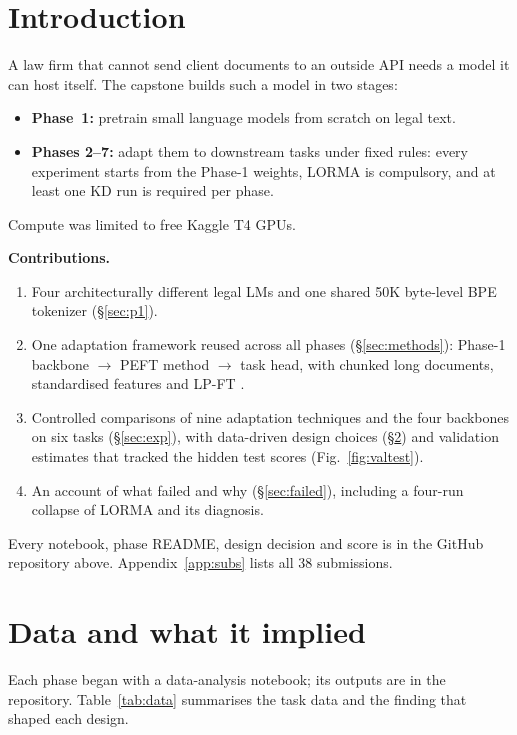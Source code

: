 \section{Introduction}
A law firm that cannot send client documents to an outside API needs a model it can host itself.
The capstone builds such a model in two stages:
\begin{itemize}
\item \textbf{Phase~1:} pretrain small language models from scratch on legal text.
\item \textbf{Phases 2--7:} adapt them to downstream tasks under fixed rules: every experiment starts from the Phase-1 weights, LORMA \cite{lorma} is compulsory, and at least one KD run is required per phase.
\end{itemize}
Compute was limited to free Kaggle T4 GPUs.

\textbf{Contributions.}
\begin{enumerate}
\item Four architecturally different legal LMs and one shared 50K byte-level BPE tokenizer (\S\ref{sec:p1}).
\item One adaptation framework reused across all phases (\S\ref{sec:methods}): Phase-1 backbone $\rightarrow$ PEFT method $\rightarrow$ task head, with chunked long documents, standardised features and LP-FT \cite{lpft}.
\item Controlled comparisons of nine adaptation techniques and the four backbones on six tasks (\S\ref{sec:exp}), with data-driven design choices (\S\ref{sec:data}) and validation estimates that tracked the hidden test scores (Fig.~\ref{fig:valtest}).
\item An account of what failed and why (\S\ref{sec:failed}), including a four-run collapse of LORMA and its diagnosis.
\end{enumerate}
Every notebook, phase README, design decision and score is in the GitHub repository above. Appendix~\ref{app:subs} lists all 38 submissions.

\section{Data and what it implied}\label{sec:data}
Each phase began with a data-analysis notebook; its outputs are in the repository. Table~\ref{tab:data} summarises the task data and the finding that shaped each design.

